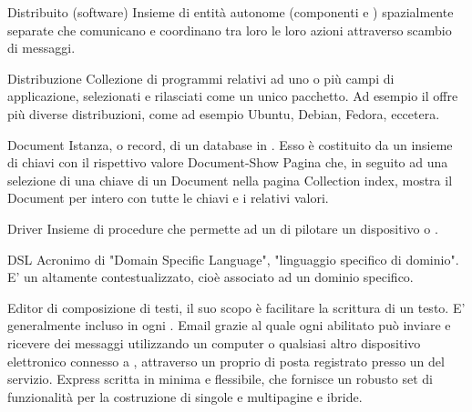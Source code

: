 \elemento
{Distribuito (software)}
{Insieme di entità autonome (componenti  e ) spazialmente separate che comunicano e coordinano tra loro le loro azioni attraverso scambio di messaggi.}

\elemento
{Distribuzione} 
{Collezione di programmi relativi ad uno o più campi di applicazione, selezionati e rilasciati come un unico pacchetto. Ad esempio il  offre più diverse distribuzioni, come ad esempio Ubuntu, Debian, Fedora, eccetera.}

\elemento
{Document}
{Istanza, o record, di un database in . Esso è costituito da un insieme di chiavi con il rispettivo valore}
\elemento
{Document-Show} 
{Pagina che, in seguito ad una selezione di una chiave di un Document nella pagina Collection index, mostra il Document per intero con tutte le chiavi e i relativi valori.}

\elemento
{Driver}
{Insieme di procedure che permette ad un  di pilotare un dispositivo  o .}

\elemento
{DSL} 
{Acronimo di "Domain Specific Language", "linguaggio specifico di dominio". E' un  altamente contestualizzato, cioè associato ad un dominio specifico.} 


\elemento
{Editor}
{ di composizione di testi, il suo scopo è facilitare la scrittura di un testo. E' generalmente incluso in ogni .}
\elemento
{Email} 
{ grazie al quale ogni  abilitato può inviare e ricevere dei messaggi utilizzando un computer o qualsiasi altro dispositivo elettronico connesso a , attraverso un proprio  di posta registrato presso un  del {servizio}.}
\elemento
{Express} 
{ scritta in  minima e flessibile, che fornisce un robusto set di funzionalità per la costruzione di singole e multipagine e  ibride.}


